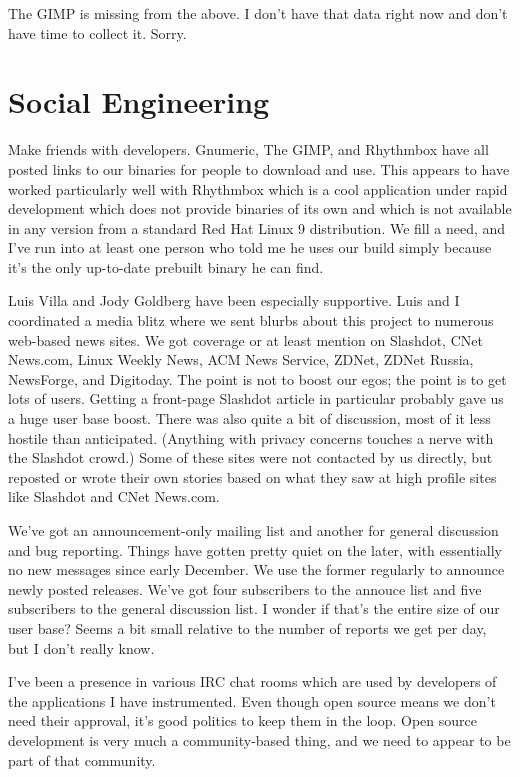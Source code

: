 \documentclass[10pt,twocolumn]{article}
\begin{document}
The GIMP is missing from the above.  I don't have that data right now
and don't have time to collect it.  Sorry.

\section{Social Engineering}

Make friends with developers.  Gnumeric, The GIMP, and Rhythmbox have
all posted links to our binaries for people to download and use.  This
appears to have worked particularly well with Rhythmbox which is a
cool application under rapid development which does not provide
binaries of its own and which is not available in any version from a
standard Red Hat Linux 9 distribution.  We fill a need, and I've run
into at least one person who told me he uses our build simply because
it's the only up-to-date prebuilt binary he can find.

Luis Villa and Jody Goldberg have been especially supportive.  Luis
and I coordinated a media blitz where we sent blurbs about this
project to numerous web-based news sites.  We got coverage or at least
mention on Slashdot, CNet News.com, Linux Weekly News, ACM News
Service, ZDNet, ZDNet Russia, NewsForge, and Digitoday.  The point is
not to boost our egos; the point is to get lots of users.  Getting a
front-page Slashdot article in particular probably gave us a huge user
base boost.  There was also quite a bit of discussion, most of it less
hostile than anticipated.  (Anything with privacy concerns touches a
nerve with the Slashdot crowd.)  Some of these sites were not
contacted by us directly, but reposted or wrote their own stories
based on what they saw at high profile sites like Slashdot and CNet
News.com.

We've got an announcement-only mailing list and another for general
discussion and bug reporting.  Things have gotten pretty quiet on the
later, with essentially no new messages since early December.  We use
the former regularly to announce newly posted releases.  We've got
four subscribers to the annouce list and five subscribers to the
general discussion list.  I wonder if that's the entire size of our
user base?  Seems a bit small relative to the number of reports we get
per day, but I don't really know.

I've been a presence in various IRC chat rooms which are used by
developers of the applications I have instrumented.  Even though open
source means we don't need their approval, it's good politics to keep
them in the loop.  Open source development is very much a
community-based thing, and we need to appear to be part of that
community.
\end{document}
